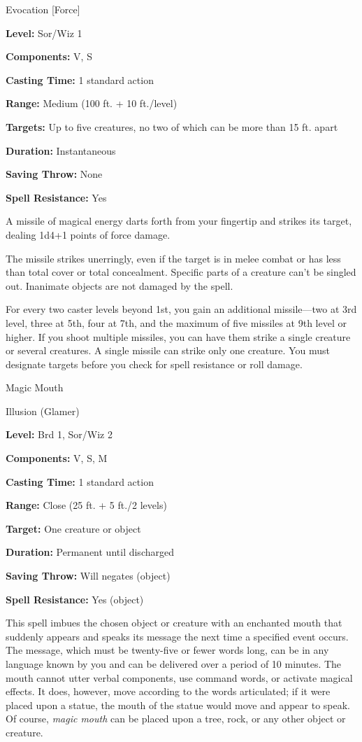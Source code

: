 \documentclass{article}
\begin{document}
Evocation [Force]

\textbf{Level:} Sor/Wiz 1

\textbf{Components:} V, S

\textbf{Casting Time:} 1 standard action

\textbf{Range: }Medium (100 ft. + 10 ft./level)

\textbf{Targets:} Up to five creatures, no two of which can be more than 15 ft. 
apart

\textbf{Duration:} Instantaneous

\textbf{Saving Throw:} None

\textbf{Spell Resistance:} Yes

A missile of magical energy darts forth from your fingertip and strikes its target, 
dealing 1d4+1 points of force damage.

The missile strikes unerringly, even if the target is in melee combat or has less 
than total cover or total concealment. Specific parts of a creature can't be singled 
out. Inanimate objects are not damaged by the spell.

For every two caster levels beyond 1st, you gain an additional missile---two at 
3rd level, three at 5th, four at 7th, and the maximum of five missiles at 9th level 
or higher. If you shoot multiple missiles, you can have them strike a single creature 
or several creatures. A single missile can strike only one creature. You must designate 
targets before you check for spell resistance or roll damage.

\vspace{12pt}
Magic Mouth

Illusion (Glamer)

\textbf{Level:} Brd 1, Sor/Wiz 2

\textbf{Components:} V, S, M

\textbf{Casting Time:} 1 standard action

\textbf{Range:} Close (25 ft. + 5 ft./2 levels)

\textbf{Target:} One creature or object

\textbf{Duration:} Permanent until discharged

\textbf{Saving Throw: }Will negates (object)

\textbf{Spell Resistance:} Yes (object)

This spell imbues the chosen object or creature with an enchanted mouth that suddenly 
appears and speaks its message the next time a specified event occurs. The message, 
which must be twenty-five or fewer words long, can be in any language known by 
you and can be delivered over a period of 10 minutes. The mouth cannot utter verbal 
components, use command words, or activate magical effects. It does, however, move 
according to the words articulated; if it were placed upon a statue, the mouth 
of the statue would move and appear to speak. Of course, \textit{magic mouth }can 
be placed upon a tree, rock, or any other object or creature.
\end{document}
